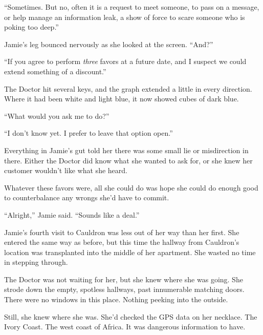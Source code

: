 ``Sometimes.  But no, often it is a request to meet someone, to pass on a message, or help manage an information leak, a show of force to scare someone who is poking too deep.''



Jamie's leg bounced nervously as she looked at the screen.  ``And?''



``If you agree to perform \emph{three} favors at a future date, and I suspect we could extend something of a discount.''



The Doctor hit several keys, and the graph extended a little in every direction.  Where it had been white and light blue, it now showed cubes of dark blue.



``What would you ask me to do?''



``I don't know yet.  I prefer to leave that option open.''



Everything in Jamie's gut told her there was some small lie or misdirection in there.  Either the Doctor did know what she wanted to ask for, or she knew her customer wouldn't like what she heard.



Whatever these favors were, all she could do was hope she could do enough good to counterbalance any wrongs she'd have to commit.



``Alright,'' Jamie said.  ``Sounds like a deal.''



\sectionbreak



Jamie's fourth visit to Cauldron was less out of her way than her first.  She entered the same way as before, but this time the hallway from Cauldron's location was transplanted into the middle of her apartment.  She wasted no time in stepping through.



The Doctor was not waiting for her, but she knew where she was going.  She strode down the empty, spotless hallways, past innumerable matching doors.  There were no windows in this place.  Nothing peeking into the outside.



Still, she knew where she was.  She'd checked the GPS data on her necklace.  The Ivory Coast.  The west coast of Africa.  It was dangerous information to have.



